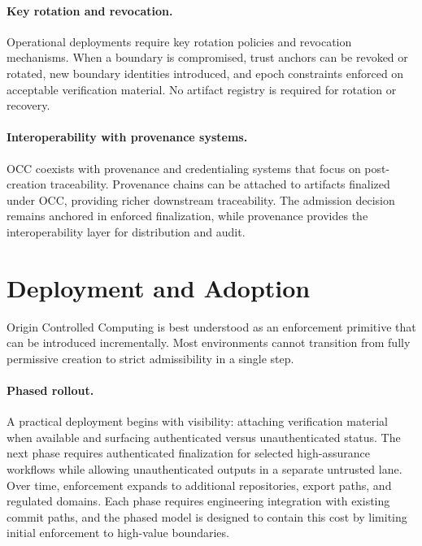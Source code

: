 \documentclass[11pt,letterpaper]{article}
\theoremstyle{occplain}
\theoremstyle{occremark}
\begin{document}
\paragraph{Key rotation and revocation.}
Operational deployments require key rotation policies and revocation mechanisms. When a boundary is compromised, trust anchors can be revoked or rotated, new boundary identities introduced, and epoch constraints enforced on acceptable verification material. No artifact registry is required for rotation or recovery.

\paragraph{Interoperability with provenance systems.}
OCC coexists with provenance and credentialing systems that focus on post-creation traceability. Provenance chains can be attached to artifacts finalized under OCC, providing richer downstream traceability. The admission decision remains anchored in enforced finalization, while provenance provides the interoperability layer for distribution and audit.


\section{Deployment and Adoption}
\label{sec:deployment}

Origin Controlled Computing is best understood as an enforcement primitive that can be introduced incrementally. Most environments cannot transition from fully permissive creation to strict admissibility in a single step.

\paragraph{Phased rollout.}
A practical deployment begins with visibility: attaching verification material when available and surfacing authenticated versus unauthenticated status. The next phase requires authenticated finalization for selected high-assurance workflows while allowing unauthenticated outputs in a separate untrusted lane. Over time, enforcement expands to additional repositories, export paths, and regulated domains. Each phase requires engineering integration with existing commit paths, and the phased model is designed to contain this cost by limiting initial enforcement to high-value boundaries.
\end{document}
